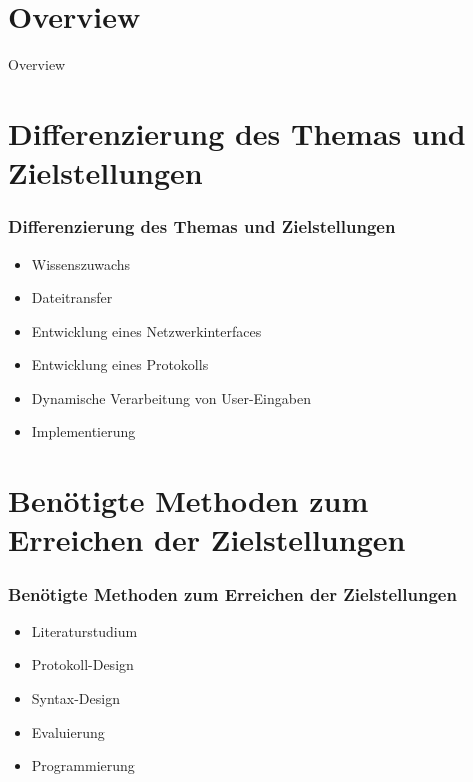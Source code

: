 \documentclass[newPxFont,numfooter,sectionpages]{beamer}
\begin{document}
%
%

\section*{Overview}
\begin{frame}{Overview}
\tableofcontents[hideallsubsections]
\end{frame}

%
%
\section{Differenzierung des Themas und Zielstellungen}
\begin{frame}
\frametitle{Differenzierung des Themas und Zielstellungen}
\begin{itemize}
\item Wissenszuwachs
\item Dateitransfer 
\item Entwicklung eines Netzwerkinterfaces
\item Entwicklung eines Protokolls
\item Dynamische Verarbeitung von User-Eingaben
\item Implementierung


\end{itemize}
\end{frame}

\section{Benötigte Methoden zum Erreichen der Zielstellungen}
\begin{frame}
\frametitle{Benötigte Methoden zum Erreichen der Zielstellungen}
\begin{itemize}


\item{Literaturstudium}
\item{Protokoll-Design}
\item{Syntax-Design}
\item{Evaluierung}
\item Programmierung
\end{itemize}

\end{frame}
\end{document}
